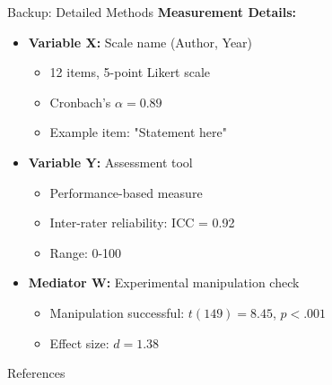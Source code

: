 \documentclass[aspectratio=169,11pt]{beamer}
\begin{document}
\begin{frame}{Backup: Detailed Methods}
  \textbf{Measurement Details:}
  \begin{itemize}
    \item \textbf{Variable X:} Scale name (Author, Year)
    \begin{itemize}
      \item 12 items, 5-point Likert scale
      \item Cronbach's $\alpha = 0.89$
      \item Example item: "Statement here"
    \end{itemize}

    \item \textbf{Variable Y:} Assessment tool
    \begin{itemize}
      \item Performance-based measure
      \item Inter-rater reliability: ICC = 0.92
      \item Range: 0-100
    \end{itemize}

    \item \textbf{Mediator W:} Experimental manipulation check
    \begin{itemize}
      \item Manipulation successful: $t(149) = 8.45$, $p < .001$
      \item Effect size: $d = 1.38$
    \end{itemize}
  \end{itemize}
\end{frame}


\begin{frame}[allowframebreaks]{References}
  \printbibliography
\end{frame}
\end{document}
